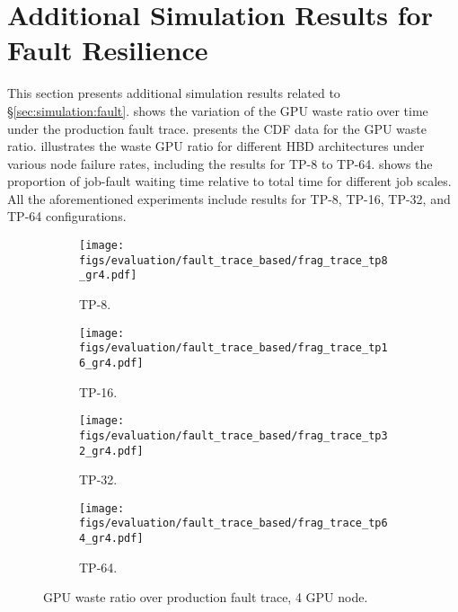 

\section{Additional Simulation Results for Fault Resilience}
\label{appendix:wasted-GPUs-ratio}
This section presents additional simulation results related to \S\ref{sec:simulation:fault}.  shows the variation of the GPU waste ratio over time under the production fault trace.  presents the CDF data for the GPU waste ratio.  illustrates the waste GPU ratio for different HBD architectures under various node failure rates, including the results for TP-8 to TP-64.  shows the proportion of job-fault waiting time relative to total time for different job scales. All the aforementioned experiments include results for TP-8, TP-16, TP-32, and TP-64 configurations.








\begin{figure*}[h!t]
    \centering
    \begin{subfigure}[b]{0.23\linewidth}
        \centering
        \texttt{[image: figs/evaluation/fault\_trace\_based/frag\_trace\_tp8\_gr4.pdf]}
        \caption{TP-8.}
        \label{fig:simulation:wasted-trace:tp8-4gpu}
    \end{subfigure}
    \hspace{2pt}
    \begin{subfigure}[b]{0.23\linewidth}
        \centering
        \texttt{[image: figs/evaluation/fault\_trace\_based/frag\_trace\_tp16\_gr4.pdf]}
        \caption{TP-16.}
        \label{fig:simulation:wasted-trace:tp16-4gpu}
    \end{subfigure}
    \hspace{2pt}
    \begin{subfigure}[b]{0.23\linewidth}
        \centering
        \texttt{[image: figs/evaluation/fault\_trace\_based/frag\_trace\_tp32\_gr4.pdf]}
        \caption{TP-32.}
        \label{fig:simulation:wasted-trace:tp32-4gpu}
    \end{subfigure}
    \hspace{2pt}
    \begin{subfigure}[b]{0.23\linewidth}
        \centering
        \texttt{[image: figs/evaluation/fault\_trace\_based/frag\_trace\_tp64\_gr4.pdf]}
        \caption{TP-64.}
        \label{fig:simulation:wasted-trace:tp64-4gpu}
    \end{subfigure}

    \vspace{-1ex}
    \caption{GPU waste ratio over production fault trace, 4 GPU node.}
    \label{fig:simulation:wasted-trace}
\end{figure*}


